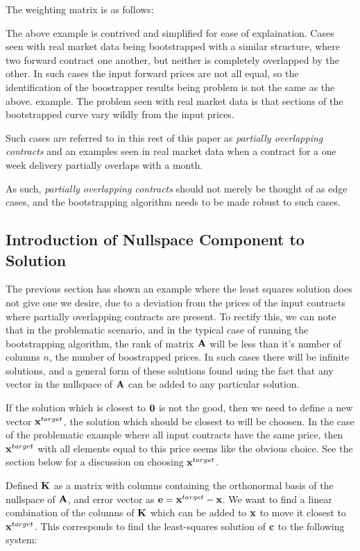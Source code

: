\documentclass{article}
\begin{document}
The weighting matrix
is as follows:




The above example is contrived and simplified for ease of explaination.
Cases seen with real market data being bootstrapped with a similar structure, where
two forward contract one another, but neither is completely overlapped by the other.
In such cases the input forward prices are not all equal, so the identification
of the boostrapper results being problem is not the same as the above.
example. The problem seen with real market data is that sections of the bootstrapped
curve vary wildly from the input prices.

Such cases are referred to in this rest of this paper as \emph{partially overlapping contracts}
and an examples seen in real market data when a contract for a one week delivery partially
overlaps with a month.

As such, \emph{partially overlapping contracts} should not merely be 
thought of as edge cases, and the bootstrapping algorithm needs to be made robust to
such cases.


\subsection{Introduction of Nullspace Component to Solution}
The previous section has shown an example where the least squares solution does 
not give one we desire, due to a deviation from the prices of the input contracts
where partially overlapping contracts are present.
To rectify this, we can note that in the problematic scenario, and in the typical
case of running the bootstrapping algorithm, the rank of matrix $\mathbf{A}$ will be
less than it's number of columns $n$, the number of boostrapped prices. In such
cases there will be infinite solutions, and a general form of these solutions found
using the fact that any vector in the nullspace of $\mathbf{A}$ can be added to any
particular solution.

\bigskip

If the solution which is closest to $\mathbf{0}$ is not the good, then we need to define
a new vector $\mathbf{x}^{target}$, the solution which should be closest to will be choosen.
In the case of the problematic example where all input contracts have the same price,
then $\mathbf{x}^{target}$ with all elements equal to this price seems like the obvious choice.
See the section below for a discussion on choosing $\mathbf{x}^{target}$.

\bigskip

Defined $\mathbf{K}$ as a matrix with columns containing the orthonormal basis of the nullspace
of $\mathbf{A}$, and error vector as $\mathbf{e} = \mathbf{x}^{target} - \mathbf{x}$. We want to find a linear combination
of the columns of $\mathbf{K}$ which can be added to $\mathbf{x}$ to move it closest to $\mathbf{x}^{target}$.
This corresponds to find the least-squares solution of $\mathbf{c}$ to the following system:
\end{document}
